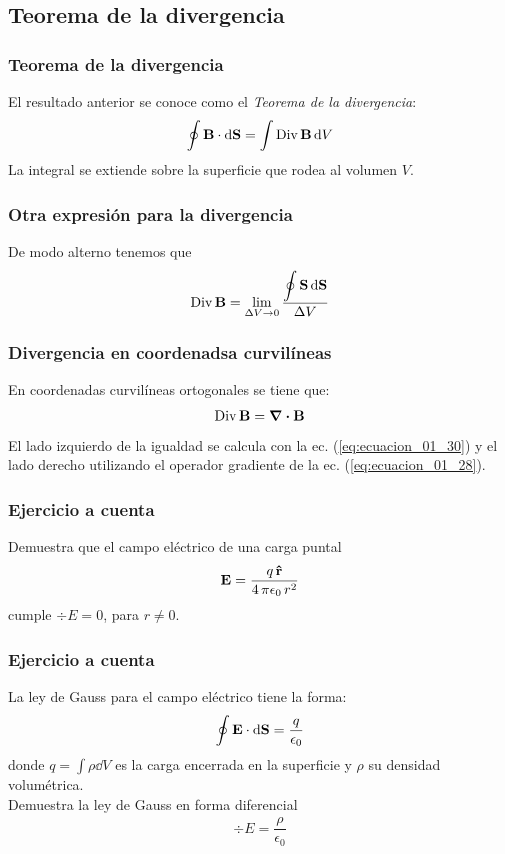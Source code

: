 \documentclass[12pt]{beamer}
\begin{document}
\subsection{Teorema de la divergencia}
\begin{frame}
\frametitle{Teorema de la divergencia}
El resultado anterior se conoce como el \emph{Teorema de la divergencia}:
\begin{align}
\oint \vb{B} \cdot \dd{\vb{S}} = \int {\rm Div} \, \vb{B} \dd{V}
\label{eq:ecuacion_01_31}
\end{align}
La integral se extiende sobre la superficie que rodea al volumen $V$.
\end{frame}
\begin{frame}
\frametitle{Otra expresión para la divergencia}
De modo alterno tenemos que
\begin{align*}
{\rm Div} \, \vb{B} = \lim_{\Delta V \to 0} \dfrac{\displaystyle \oint \vb{S} \dd{\vb{S}}}{\Delta V}
\end{align*}
\end{frame}
\begin{frame}
\frametitle{Divergencia en coordenadsa curvilíneas}
En coordenadas curvilíneas ortogonales se tiene que:
\begin{align*}
{\rm Div} \, \vb{B} = \div{\vb{B}}
\end{align*}
\pause
El lado izquierdo de la igualdad se calcula con la ec. (\ref{eq:ecuacion_01_30}) y el lado derecho utilizando el operador gradiente de la ec. (\ref{eq:ecuacion_01_28}).
\end{frame}
\begin{frame}
\frametitle{Ejercicio a cuenta}
Demuestra que el campo eléctrico de una carga puntal
\begin{align*}
\vb{E} = \dfrac{q \, \vu{r}}{4 \, \pi \epsilon_{0} \, r^{2}}
\end{align*}
cumple $\div{E} = 0$, para $r \neq 0$.
\end{frame}
\begin{frame}
\frametitle{Ejercicio a cuenta}
La ley de Gauss para el campo eléctrico tiene la forma:
\begin{align*}
\oint \vb{E} \cdot \dd{\vb{S}} = \dfrac{q}{\epsilon_{0}}
\end{align*}
donde $q = \displaystyle \int \rho \dd{V}$ es la carga encerrada en la superficie y $\rho$ su densidad volumétrica.
\\
\bigskip
Demuestra la ley de Gauss en forma diferencial
\begin{align*}
\div{E} = \dfrac{\rho}{\epsilon_{0}}
\end{align*}
\end{frame}
\end{document}

